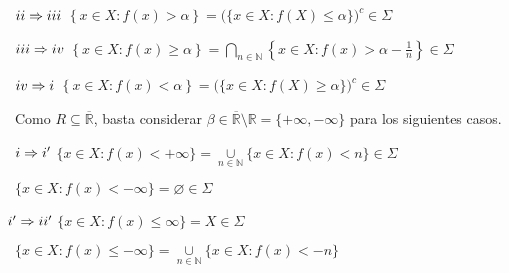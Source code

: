 \documentclass[12pt,a4paper]{article}
\newcommand{\R}{\mathbb{R}}
\newcommand{\N}{\mathbb{N}}
\newcommand{\smallcup}{\mathop{\cup}\limits}
\begin{document}
\vspace{1mm}
\begin{tcolorbox}
    \hspace{-5mm} $\romannumeral 2 \Rightarrow \romannumeral 3$ \hspace{3mm} $\left\{x \in X : f(x) > \alpha \right\} = \Big(\{x \in X : f(X) \leq \alpha\}\Big)^c  \in \Sigma$
\end{tcolorbox}

\vspace{1mm}
\begin{tcolorbox}
   \hspace{-6mm} $\romannumeral 3 \Rightarrow \romannumeral 4$ \hspace{3mm} $\left\{x \in X : f(x) \geq \alpha \right\} = \displaystyle \bigcap_{n \in \N} \left\{x \in X : f(x) > \alpha  - \frac{1}{n}\right\} \in \Sigma$
\end{tcolorbox}

\vspace{1mm}
\begin{tcolorbox}
    \hspace{-4mm} $\romannumeral 4 \Rightarrow \romannumeral 1$ \hspace{3mm} $\left\{x \in X : f(x) < \alpha \right\} = \Big(\{x \in X : f(X) \geq \alpha\}\Big)^c \in \Sigma$
\end{tcolorbox}
\vspace{4mm} \noindent
Como $ R \subseteq\overline{\R}$, basta considerar $\beta \in \overline{\R}\setminus \R = \{+\infty, -\infty\}$ para los siguientes casos.

\begin{tcolorbox}
    \hspace{-2mm} $\romannumeral 1 \Rightarrow \romannumeral 1'$ \hspace{3mm} $\{x \in X : f(x) < +\infty\} = \smallcup_{n\in\N} \{x \in X : f(x) < n\} \in \Sigma$ 
\end{tcolorbox}
$\{x \in X : f(x) < - \infty\} = \varnothing \in \Sigma$

\begin{tcolorbox}   
    $\hspace{-2mm} \romannumeral 1' \Rightarrow \romannumeral 2'$ \hspace{3mm} $\{x \in X : f(x) \leq \infty\} = X \in \Sigma$  
\end{tcolorbox}
$\{x \in X : f(x) \leq - \infty\} = \smallcup_{n\in\N} \{x \in X : f(x) < -n\}$
\end{document}

